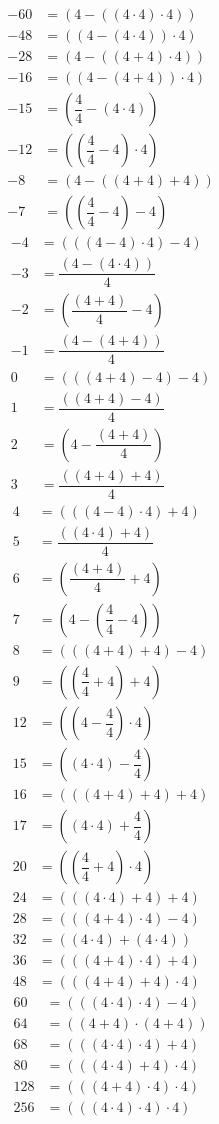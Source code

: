 \[\begin{aligned}-60&=(4-((4\cdot 4)\cdot 4))\\-48&=((4-(4\cdot 4))\cdot 4)\\-28&=(4-((4+4)\cdot 4))\\-16&=((4-(4+4))\cdot 4)\\-15&=(\dfrac{4}{4}-(4\cdot 4))\\-12&=((\dfrac{4}{4}-4)\cdot 4)\\-8&=(4-((4+4)+4))\\-7&=((\dfrac{4}{4}-4)-4)\end{aligned}\]\[\begin{aligned}-4&=(((4-4)\cdot 4)-4)\\-3&=\dfrac{(4-(4\cdot 4))}{4}\\-2&=(\dfrac{(4+4)}{4}-4)\\-1&=\dfrac{(4-(4+4))}{4}\\0&=(((4+4)-4)-4)\\1&=\dfrac{((4+4)-4)}{4}\\2&=(4-\dfrac{(4+4)}{4})\\3&=\dfrac{((4+4)+4)}{4}\end{aligned}\]\[\begin{aligned}4&=(((4-4)\cdot 4)+4)\\5&=\dfrac{((4\cdot 4)+4)}{4}\\6&=(\dfrac{(4+4)}{4}+4)\\7&=(4-(\dfrac{4}{4}-4))\\8&=(((4+4)+4)-4)\\9&=((\dfrac{4}{4}+4)+4)\\12&=((4-\dfrac{4}{4})\cdot 4)\\15&=((4\cdot 4)-\dfrac{4}{4})\end{aligned}\]\[\begin{aligned}16&=(((4+4)+4)+4)\\17&=((4\cdot 4)+\dfrac{4}{4})\\20&=((\dfrac{4}{4}+4)\cdot 4)\\24&=(((4\cdot 4)+4)+4)\\28&=(((4+4)\cdot 4)-4)\\32&=((4\cdot 4)+(4\cdot 4))\\36&=(((4+4)\cdot 4)+4)\\48&=(((4+4)+4)\cdot 4)\end{aligned}\]\[\begin{aligned}60&=(((4\cdot 4)\cdot 4)-4)\\64&=((4+4)\cdot (4+4))\\68&=(((4\cdot 4)\cdot 4)+4)\\80&=(((4\cdot 4)+4)\cdot 4)\\128&=(((4+4)\cdot 4)\cdot 4)\\256&=(((4\cdot 4)\cdot 4)\cdot 4)\end{aligned}\]
